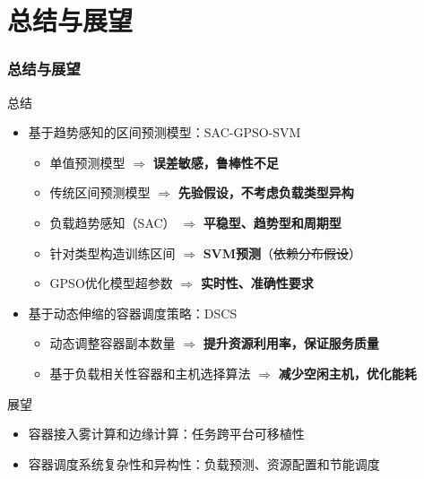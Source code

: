 \section{总结与展望}

\begin{frame}
\frametitle{总结与展望}
\begin{block}{总结}
\begin{itemize}
    \item 基于趋势感知的区间预测模型：SAC-GPSO-SVM
    \begin{itemize}
        \item {\color{gray}单值预测模型 $\Rightarrow$ \textbf{误差敏感，鲁棒性不足}}
        \item {\color{gray}传统区间预测模型 $\Rightarrow$ \textbf{先验假设，不考虑负载类型异构}}
        \item 负载趋势感知（SAC） $\Rightarrow$ \textbf{平稳型、趋势型和周期型}
        \item 针对类型构造训练区间 $\Rightarrow$ \textbf{SVM预测}（\sout{依赖分布假设}）
        \item GPSO优化模型超参数 $\Rightarrow$ \textbf{实时性、准确性要求}
    \end{itemize}
    \item 基于动态伸缩的容器调度策略：DSCS
    \begin{itemize}
        \item 动态调整容器副本数量 $\Rightarrow$ \textbf{提升资源利用率，保证服务质量}
        \item 基于负载相关性容器和主机选择算法 $\Rightarrow$ \textbf{减少空闲主机，优化能耗}
    \end{itemize}
\end{itemize}
\end{block}
\begin{exampleblock}{展望}
    \begin{itemize}
        \item 容器接入雾计算和边缘计算：任务跨平台可移植性
        \item 容器调度系统复杂性和异构性：负载预测、资源配置和节能调度
    \end{itemize}
\end{exampleblock}
\end{frame}
